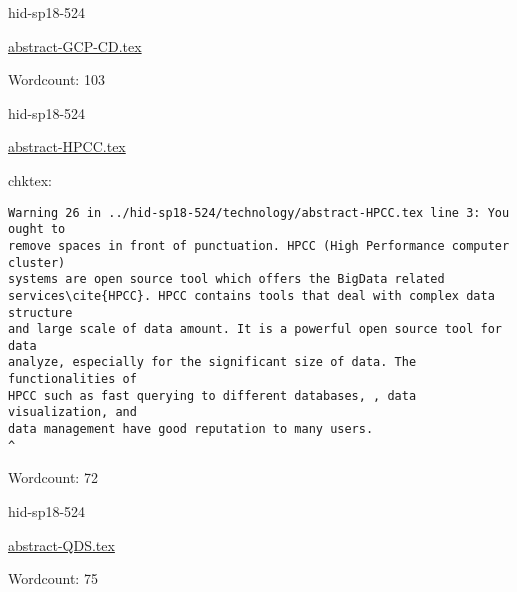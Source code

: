 

\begin{IU}

hid-sp18-524

\href{https://github.com/cloudmesh-community/hid-sp18-524/blob/master//technology/abstract-GCP-CD.tex}{abstract-GCP-CD.tex}

 

Wordcount: 103

\end{IU}



\begin{IU}

hid-sp18-524

\href{https://github.com/cloudmesh-community/hid-sp18-524/blob/master//technology/abstract-HPCC.tex}{abstract-HPCC.tex}

 
chktex:
\begin{tiny}
\begin{verbatim}
Warning 26 in ../hid-sp18-524/technology/abstract-HPCC.tex line 3: You ought to
remove spaces in front of punctuation. HPCC (High Performance computer cluster)
systems are open source tool which offers the BigData related
services\cite{HPCC}. HPCC contains tools that deal with complex data structure
and large scale of data amount. It is a powerful open source tool for data
analyze, especially for the significant size of data. The functionalities of
HPCC such as fast querying to different databases, , data visualization, and
data management have good reputation to many users.
^
\end{verbatim}
\end{tiny}

Wordcount: 72

\end{IU}



\begin{IU}

hid-sp18-524

\href{https://github.com/cloudmesh-community/hid-sp18-524/blob/master//technology/abstract-QDS.tex}{abstract-QDS.tex}

 

Wordcount: 75

\end{IU}




